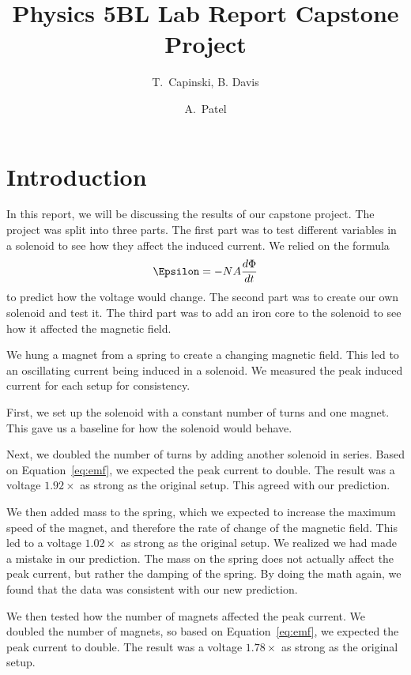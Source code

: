 \documentclass[11pt]{article}
\title{Physics 5BL Lab Report Capstone Project}
\author{T.~Capinski, B. Davis \and A.~Patel}
\let\oldsection\section
\renewcommand\section{\clearpage\oldsection}
\begin{document}
    \maketitle
    \tableofcontents

    \section*{Introduction}\label{sec:introduction}

    In this report, we will be discussing the results of our capstone project.
    The project was split into three parts.
    The first part was to test different variables in a solenoid to see how they affect the induced current.
    We relied on the formula
    \begin{equation}
        \Epsilon = -N A \frac{d\Phi}{dt}
        \label{eq:emf}
    \end{equation}
    to predict how the voltage would change.
    The second part was to create our own solenoid and test it.
    The third part was to add an iron core to the solenoid to see how it affected the magnetic field.

    We hung a magnet from a spring to create a changing magnetic field.
    This led to an oscillating current being induced in a solenoid.
    We measured the peak induced current for each setup for consistency.

    First, we set up the solenoid with a constant number of turns and one magnet.
    This gave us a baseline for how the solenoid would behave.

    Next, we doubled the number of turns by adding another solenoid in series.
    Based on Equation~\ref{eq:emf}, we expected the peak current to double.
    The result was a voltage $1.92 \times$ as strong as the original setup.
    This agreed with our prediction.

    We then added mass to the spring, which we expected to increase the maximum speed of the magnet, and therefore the rate of change of the magnetic field.
    This led to a voltage $1.02 \times$ as strong as the original setup.
    We realized we had made a mistake in our prediction.
    The mass on the spring does not actually affect the peak current, but rather the damping of the spring.
    By doing the math again, we found that the data was consistent with our new prediction.

    We then tested how the number of magnets affected the peak current.
    We doubled the number of magnets, so based on Equation~\ref{eq:emf}, we expected the peak current to double.
    The result was a voltage $1.78 \times$ as strong as the original setup.
\end{document}
